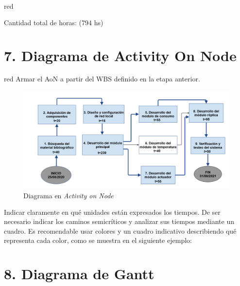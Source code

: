 \documentclass[11pt]{charter}
\begin{document}
\begin{consigna}{red}
\begin{enumerate}
\end{enumerate}

Cantidad total de horas: (794 hs)

\end{consigna}

\section{7. Diagrama de Activity On Node}
\label{sec:AoN}

\begin{consigna}{red}
Armar el AoN a partir del WBS definido en la etapa anterior. 



\end{consigna}

\begin{figure}[htpb]
\centering 
\includegraphics[width=.8\textwidth]{./Figuras/AoN.png}
\caption{Diagrama en \textit{Activity on Node}}
\label{fig:AoN}
\end{figure}

Indicar claramente en qué unidades están expresados los tiempos.
De ser necesario indicar los caminos semicríticos y analizar sus tiempos mediante un cuadro.
Es recomendable usar colores y un cuadro indicativo describiendo qué representa cada color, como se muestra en el siguiente ejemplo:



\section{8. Diagrama de Gantt}
\label{sec:gantt}
\end{document}
